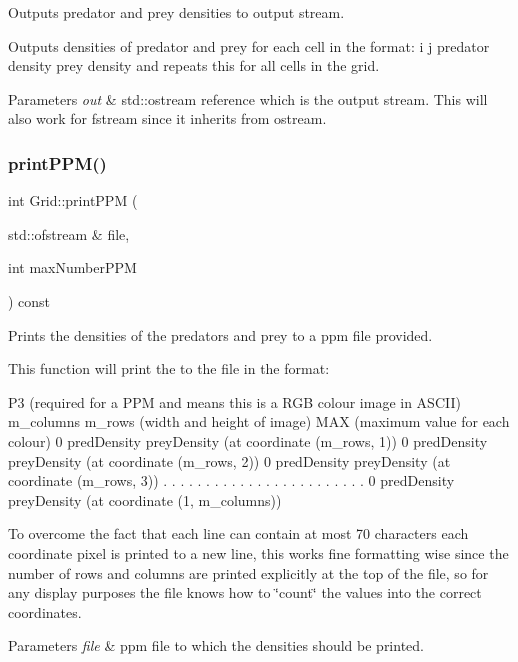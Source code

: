 Outputs predator and prey densities to output stream. 

Outputs densities of predator and prey for each cell in the format\+: i j predator density prey density and repeats this for all cells in the grid.


\begin{DoxyParams}{Parameters}
{\em out} & std\+::ostream reference which is the output stream. This will also work for fstream since it inherits from ostream. \\
\hline
\end{DoxyParams}
\mbox{\label{class_grid_acf89a88b063c4f641ad1331bcf9447ad}} 
\subsubsection{\texorpdfstring{print\+P\+P\+M()}{printPPM()}}
{\footnotesize\ttfamily int Grid\+::print\+P\+PM (\begin{DoxyParamCaption}\item[{std\+::ofstream \&}]{file,  }\item[{int}]{max\+Number\+P\+PM }\end{DoxyParamCaption}) const}



Prints the densities of the predators and prey to a ppm file provided. 

This function will print the to the file in the format\+:

P3 (required for a P\+PM and means this is a R\+GB colour image in A\+S\+C\+II) m\+\_\+columns m\+\_\+rows (width and height of image) M\+AX (maximum value for each colour) 0 pred\+Density prey\+Density (at coordinate (m\+\_\+rows, 1)) 0 pred\+Density prey\+Density (at coordinate (m\+\_\+rows, 2)) 0 pred\+Density prey\+Density (at coordinate (m\+\_\+rows, 3)) . . . . . . . . . . . . . . . . . . . . . . . . 0 pred\+Density prey\+Density (at coordinate (1, m\+\_\+columns))

To overcome the fact that each line can contain at most 70 characters each coordinate pixel is printed to a new line, this works fine formatting wise since the number of rows and columns are printed explicitly at the top of the file, so for any display purposes the file knows how to \char`\"{}count\char`\"{} the values into the correct coordinates.


\begin{DoxyParams}{Parameters}
{\em file} & ppm file to which the densities should be printed. \\
\hline
\end{DoxyParams}
\mbox{\label{class_grid_a17c062fcf4063a811bd8d95c32bce723}} 
